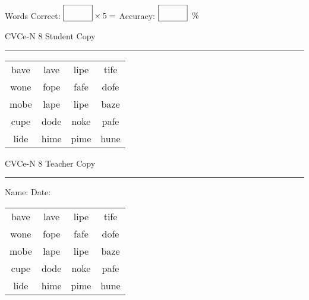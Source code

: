 \documentclass{memoir}
\begin{document}
\small

Words Correct: $\fbox{\phantom{\huge 100}} \times 5 = $ Accuracy: $\fbox{\phantom{\huge 100}}\;\; \%$ 

\vfill

\newpage


\footnotesize \noindent
CVCe-N 8 \hfill Student Copy
\smallskip
\hrule

\Large

\setlength{\tabcolsep}{14pt}
\def\arraystretch{2}

{\selectfont


\begin{vplace}[0.5]
\begin{center}
\begin{tabular}{cccc}
bave & lave & lipe & tife \\
wone & fope & fafe & dofe \\
mobe & lape & lipe & baze \\
cupe & dode & noke & pafe \\
lide & hime & pime & hune \\
\end{tabular}
\end{center}
\end{vplace}

}

\newpage

\footnotesize \noindent
CVCe-N 8 \hfill Teacher Copy
\smallskip
\hrule

\small

\vfill

\noindent
Name: \underline{\hspace{1.75in}} \hfill Date: \underline{\hspace{1in}}

\Large

{\selectfont


\begin{vplace}[0.5]
\begin{center}
\begin{tabular}{cccc}
bave & lave & lipe & tife \\
wone & fope & fafe & dofe \\
mobe & lape & lipe & baze \\
cupe & dode & noke & pafe \\
lide & hime & pime & hune \\
\end{tabular}
\end{center}
\end{vplace}



}
\end{document}
